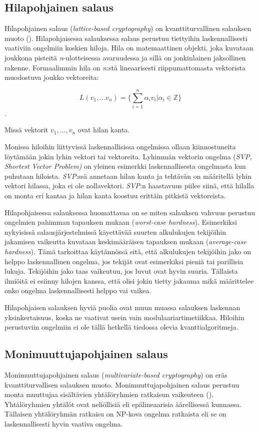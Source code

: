 \subsection{Hilapohjainen salaus}
Hilapohjainen salaus (\emph{lattice-based cryptography}) on kvanttiturvallinen salauksen muoto (\cite{regev2006lattice}). Hilapohjaisessa salauksessa salaus perustuu tiettyihin laskennallisesti vaativiin ongelmiin koskien hiloja. Hila on matemaattinen objekti, joka kuvataan joukkona pisteitä \emph{n}-ulotteisessa avaruudessa ja sillä on jonkinlainen jaksollinen rakenne. Formaalimmin hila on \emph{n}:stä lineaarisesti riippumattomasta vektorista muodostuva joukko vektoreita: 

\[L(v_1,...v_n) =\Bigg\{ {\sum_{i=1}^{n}\alpha_i 
v_i|\alpha_i \in \mathbb{Z}} \Bigg\}\]. 

Missä vektorit $v_1,...,v_n$ ovat hilan kanta.

Monissa hiloihin liittyvissä 
laskennallisissa ongelmissa ollaan kiinnostuneita löytämään jokin lyhin vektori tai vektoreita. Lyhimmän vektorin ongelma (\emph{SVP, Shortest Vector Problem)} on yleinen esimerkki laskennallisesta ongelmasta kun puhutaan hiloista. \emph{SVP}:ssä annetaan hilan kanta ja tehtävän on määritellä lyhin vektori hilassa, joka ei ole nollavektori. \emph{SVP}:n haastavuus piilee siinä, että hilalla on monta eri kantaa ja hilan kanta koostuu erittäin pitkistä vektoreista.

Hilapohjaisessa salauksessa huomattavaa on se miten salauksen vahvuus perustuu ongelmien pahimman tapauksen mukaan (\emph{worst-case hardness}). Esimerkiksi nykyisissä salausjärjestelmissä käyettävää suurten alkulukujen tekijöihin jakamisen vaikeutta kuvataan keskimääräisen tapauksen mukaan (\emph{average-case hardness}). Tämä tarkoittaa käytännössä sitä, että alkulukujen tekijöihin jako on helppo laskennallinen ongelma, jos tekijät ovat esimerkiksi pieniä tai parillisia lukuja. Tekijöihin jako taas vaikeutuu, jos luvut ovat hyvin suuria. Tällaista ilmiöitä ei esiinny hilojen kanssa, että olisi jokin tietty jakauma mikä määrittelee onko ongelma laskennallisesti helppo vai vaikea.

Hilapohjaisen salauksen hyviä puolia ovat muun muassa salauksen laskennan yksinkertaisuus, koska ne vaativat usein vain modulaariartimetiikkaa. Hiloihin perustuviin ongelmiin ei ole tällä hetkellä tiedossa olevia kvanttialgoritmeja.

\subsection{Monimuuttujapohjainen salaus}
Monimuuttujapohjainen salaus (\emph{multivariate-based cryptography}) on eräs kvanttiturvallisen salauksen muoto. Monimuuttujapohjainen salaus perustuu monta muuttujaa sisältävien yhtälöryhmien ratkaisun vaikeuteen (\cite{Ding2009}). Yhtälöryhmien yhtälöt ovat neliöllisiä eli epälineaarisia äärellisessä kunnassa. Tällaisen yhtälöryhmän ratkaisu on NP-kova ongelma ratkaista eli se on laskennallisesti hyvin vaativa ongelma.